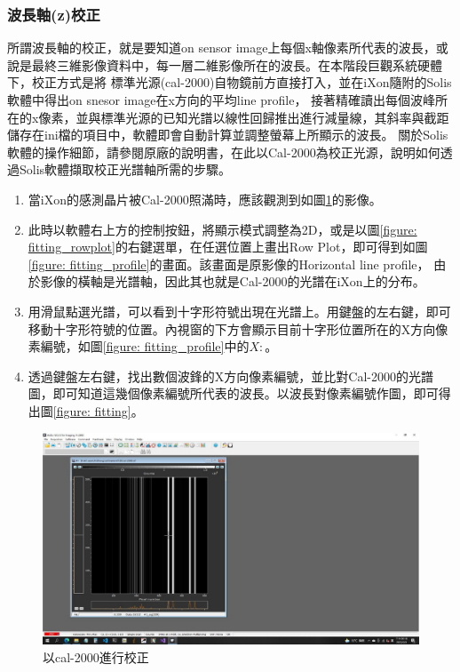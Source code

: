 \documentclass[12pt]{article}
\begin{document}
    \subsubsection{波長軸(z)校正} \label{section: z cali}
    所謂波長軸的校正，就是要知道on sensor image上每個x軸像素所代表的波長，或說是最終三維影像資料中，每一層二維影像所在的波長。在本階段巨觀系統硬體下，校正方式是將
    標準光源(cal-2000)自物鏡前方直接打入，並在iXon隨附的Solis軟體中得出on snesor image在x方向的平均line profile，
    接著精確讀出每個波峰所在的x像素，並與標準光源的已知光譜以線性回歸推出進行減量線，其斜率與截距儲存在ini檔的項目中，軟體即會自動計算並調整螢幕上所顯示的波長。
    關於Solis軟體的操作細節，請參閱原廠的說明書，在此以Cal-2000為校正光源，說明如何透過Solis軟體擷取校正光譜軸所需的步驟。
    \begin{enumerate}
        \item 當iXon的感測晶片被Cal-2000照滿時，應該觀測到如圖\ref{figure: fitting_image}的影像。
        \item 此時以軟體右上方的控制按鈕，將顯示模式調整為2D，或是以圖\ref{figure: fitting_rowplot}的右鍵選單，在任選位置上畫出Row Plot，即可得到如圖\ref{figure: fitting_profile}的畫面。該畫面是原影像的Horizontal line profile，
        由於影像的橫軸是光譜軸，因此其也就是Cal-2000的光譜在iXon上的分布。
        \item 用滑鼠點選光譜，可以看到十字形符號出現在光譜上。用鍵盤的左右鍵，即可移動十字形符號的位置。內視窗的下方會顯示目前十字形位置所在的X方向像素編號，如圖\ref{figure: fitting_profile}中的$X:$。
        \item 透過鍵盤左右鍵，找出數個波鋒的X方向像素編號，並比對Cal-2000的光譜圖，即可知道這幾個像素編號所代表的波長。以波長對像素編號作圖，即可得出圖\ref{figure: fitting}。
    \end{enumerate}
    \begin{figure}[ht]
        \centering
        \includegraphics[width=\linewidth]{cal2000examImage.jpeg}
        \caption{以cal-2000進行校正}
        \label{figure: fitting_image}
    \end{figure}
\end{document}
